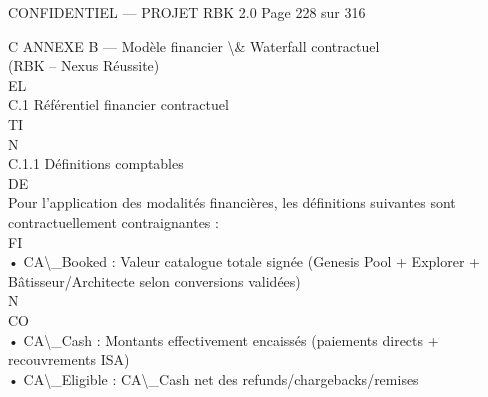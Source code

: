 \documentclass[12pt,landscape,a4paper]{article}
\newenvironment{confidential}
{\begin{tcolorbox}[
    colback=rbkred!5!white,
    colframe=rbkred!75!black,
    title=CONFIDENTIEL,
    fonttitle=\bfseries\color{white},
    coltitle=rbkred!75!black,
    breakable,
    enhanced,
    frame hidden,
    borderline west={2pt}{0pt}{rbkred!75!black}
]}
{\end{tcolorbox}}
\begin{document}
\vspace{0.5em}
\begin{confidential}CONFIDENTIEL — PROJET RBK 2.0                                       Page 228 sur 316\end{confidential}
C \textbar{} ANNEXE B — Modèle financier \textbackslash{}& Waterfall contractuel\\
(RBK – Nexus Réussite)\\
\vspace{0.5em}
\vspace{0.5em}
\vspace{0.5em}
\vspace{0.5em}
EL\\
C.1 Référentiel financier contractuel\\
\vspace{0.5em}
\vspace{0.5em}
\vspace{0.5em}
\vspace{0.5em}
TI\\
N\\
C.1.1 Définitions comptables\\
\vspace{0.5em}
\vspace{0.5em}
\vspace{0.5em}
\vspace{0.5em}
DE\\
Pour l’application des modalités financières, les définitions suivantes sont contractuellement contraignantes :\\
\vspace{0.5em}
\vspace{0.5em}
\vspace{0.5em}
\vspace{0.5em}
FI\\
• CA\textbackslash{}_Booked : Valeur catalogue totale signée (Genesis Pool + Explorer + Bâtisseur/Architecte selon conversions validées)\\
\vspace{0.5em}
\vspace{0.5em}
N\\
CO\\
• CA\textbackslash{}_Cash : Montants effectivement encaissés (paiements directs + recouvrements ISA)\\
\vspace{0.5em}
• CA\textbackslash{}_Eligible : CA\textbackslash{}_Cash net des refunds/chargebacks/remises\\
\vspace{0.5em}
\end{document}
